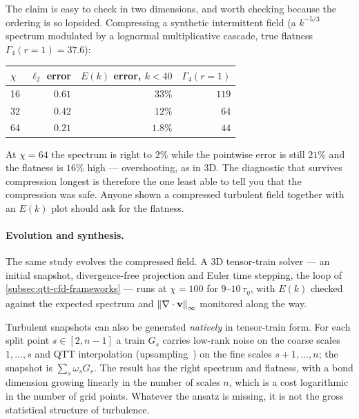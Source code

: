 \begin{remark}
  The claim is easy to check in two dimensions, and worth checking because the
  ordering is so lopsided. Compressing a synthetic intermittent field (a
  $k^{-5/3}$ spectrum modulated by a lognormal multiplicative cascade, true
  flatness $\Gamma_4(r{=}1) = 37.6$):

  \begin{center}
    \begin{tabular}{@{}lrrr@{}}
      \toprule
      $\chi$ & $\ell_2$ error & $E(k)$ error, $k<40$ & $\Gamma_4(r{=}1)$ \\
      \midrule
      16 & $0.61$ & $33\%$   & $119$ \\
      32 & $0.42$ & $12\%$   & $64$ \\
      64 & $0.21$ & $1.8\%$  & $44$ \\
      \bottomrule
    \end{tabular}
  \end{center}

  \noindent
  At $\chi = 64$ the spectrum is right to $2\%$ while the pointwise error is
  still $21\%$ and the flatness is $16\%$ high --- overshooting, as in 3D. The
  diagnostic that survives compression longest is therefore the one least able
  to tell you that the compression was safe. Anyone shown a compressed
  turbulent field together with an $E(k)$ plot should ask for the flatness.
\end{remark}

\paragraph{Evolution and synthesis.}
The same study evolves the compressed field. A 3D tensor-train solver --- an
initial snapshot, divergence-free projection and Euler time stepping, the loop
of \cref{subsec:qtt-cfd-frameworks} --- runs at $\chi = 100$ for
$9$--$10\,\tau_\eta$, with $E(k)$ checked against the expected spectrum and
$\left\|\nabla\cdot\mathbf{v}\right\|_\infty$ monitored along the way.

Turbulent snapshots can also be generated \emph{natively} in tensor-train form.
For each split point $s \in [2, n-1]$ a train $G_s$ carries low-rank noise on the
coarse scales $1,\dots,s$ and QTT interpolation (upsampling~\cite{Guzman2026})
on the fine scales $s+1,\dots,n$; the snapshot is $\sum_s \omega_s G_s$. The
result has the right spectrum and flatness, with a bond dimension growing
linearly in the number of scales $n$, which is a cost logarithmic in the number
of grid points. Whatever the ansatz is missing, it is not the gross statistical
structure of turbulence.

